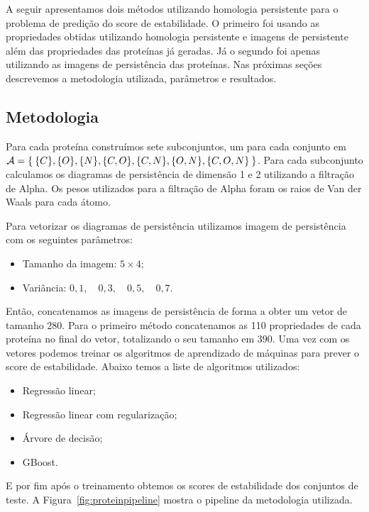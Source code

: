 A seguir apresentamos dois métodos utilizando homologia persistente para o problema de predição
do score de estabilidade. O primeiro foi usando as propriedades obtidas utilizando
homologia persistente e imagens de persistente além das propriedades das proteínas já geradas. 
Já o segundo foi apenas utilizando as imagens de persistência das proteínas. Nas próximas
seções descrevemos a metodologia utilizada, parâmetros e resultados.

\subsection{Metodologia}
Para cada proteína construímos sete subconjuntos, um para cada conjunto em $\mathcal{A} = \Set{\{C\}, \{O\}, \{N\}, 
\{C, O\}, \{C, N\}, \{O,N\}, \{C,O,N\}}$. Para cada subconjunto calculamos os diagramas de persistência
de dimensão 1 e 2 utilizando a filtração de Alpha. Os pesos utilizados para a filtração de Alpha foram os raios
de Van der Waals para cada átomo. 

Para vetorizar os diagramas de persistência utilizamos imagem de persistência com os seguintes parâmetros:
\begin{itemize}
    \item Tamanho da imagem: $5 \times 4$;
    \item Variância: $0,1,\quad 0,3,\quad 0,5,\quad 0,7$. 
\end{itemize}

Então, concatenamos as imagens de persistência de forma a obter um vetor de tamanho $280$. Para o
primeiro método concatenamos as 110 propriedades de cada proteína no final do vetor, totalizando 
o seu tamanho em $390$. Uma vez com os vetores podemos treinar os algoritmos de aprendizado de máquinas
para prever o score de estabilidade. Abaixo temos a liste de algoritmos utilizados:
\begin{itemize}
    \item Regressão linear;
    \item Regressão linear com regularização; 
    \item Árvore de decisão;
    \item GBoost. 
\end{itemize}
E por fim após o treinamento obtemos os scores de estabilidade dos conjuntos de teste. 
A Figura~\ref{fig:proteinpipeline} mostra o pipeline da metodologia utilizada. 

